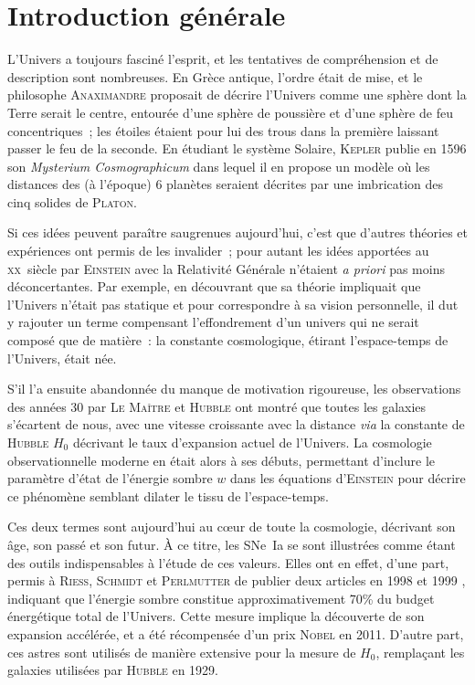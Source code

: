 \documentclass[../main/main.tex]{subfiles}
\begin{document}
\chapter*{Introduction g\'en\'erale}

L'Univers a toujours fasciné l'esprit, et les tentatives de compréhension et de
description sont nombreuses. En Grèce antique, l'ordre était de mise, et le
philosophe \textsc{Anaximandre} proposait de décrire l'Univers comme une sphère
dont la Terre serait le centre, entourée d'une sphère de poussière et d'une
sphère de feu concentriques~; les étoiles étaient pour lui des trous dans la
première laissant passer le feu de la seconde. En étudiant le système Solaire,
\textsc{Kepler} publie en 1596 son \textit{Mysterium Cosmographicum} dans lequel
il en propose un modèle où les distances des (à l'époque) 6 planètes seraient
décrites par une imbrication des cinq solides de \textsc{Platon}.

Si ces idées peuvent paraître saugrenues aujourd'hui, c'est que d'autres
théories et expériences ont permis de les invalider~; pour autant les idées
apportées au \textsc{xx}\ieme\ siècle par \textsc{Einstein} avec la Relativité
Générale \citep{einstein1915} n'étaient \textit{a priori} pas moins
déconcertantes. Par exemple, en découvrant que sa théorie impliquait que
l'Univers n'était pas statique et pour correspondre à sa vision personnelle, il
dut y rajouter un terme compensant l'effondrement d'un univers qui ne serait
composé que de matière~: la constante cosmologique, étirant l'espace-temps de
l'Univers, était née.

S'il l'a ensuite abandonnée du manque de motivation rigoureuse, les observations
des années 30 par \textsc{Le Maître} et \textsc{Hubble} \citep{hubble1929} ont
montré que toutes les galaxies s'écartent de nous, avec une vitesse croissante
avec la distance \textit{via} la constante de \textsc{Hubble} $H_0$ décrivant le
taux d'expansion actuel de l'Univers. La cosmologie observationnelle moderne en
était alors à ses débuts, permettant d'inclure le paramètre d'état de l'énergie
sombre $w$ dans les équations d'\textsc{Einstein} pour décrire ce phénomène
semblant dilater le tissu de l'espace-temps.

Ces deux termes sont aujourd'hui au cœur de toute la cosmologie, décrivant son
âge, son passé et son futur. À ce titre, les SNe~Ia se sont illustrées comme
étant des outils indispensables à l'étude de ces valeurs. Elles ont en effet,
d'une part, permis à \textsc{Riess}, \textsc{Schmidt} et \textsc{Perlmutter} de
publier deux articles en 1998 et 1999 \citep{riess1998, perlmutter1999},
indiquant que l'énergie sombre constitue approximativement 70\% du budget
énergétique total de l'Univers. Cette mesure implique la découverte de son
expansion accélérée, et a été récompensée d'un prix \textsc{Nobel} en 2011.
D'autre part, ces astres sont utilisés de manière extensive pour la mesure de
$H_0$, remplaçant les galaxies utilisées par \textsc{Hubble} en 1929.
\end{document}
